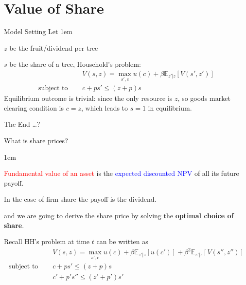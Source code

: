 \documentclass[handout, 11pt,aspectratio=43,usenames,dvipsnames]{beamer}
\newcommand{\red}[1]{\textcolor{red}{#1}}
\newcommand{\blue}[1]{\textcolor{blue}{#1}}
\let\olditemize=\itemize
\let\endolditemize=\enditemize
\renewenvironment{itemize}{\olditemize \itemsep1em}{\endolditemize}
\theoremstyle{definition}
\begin{document}
\section{Value of Share}
\label{sec:Value_of_Share}


\begin{frame}{Model Setting}
\label{slide:Model_Setting}
    Let
    \begin{itemize}
        \item $ z $ be the fruit/dividend per tree
        \item $ s $ be the share of a tree,
    \end{itemize}
    Household's problem:
    \begin{align}
            & V(s, z) = \max_{s', c} u(c) + \beta \mathbb{E}_{z'|z} [V(s', z')]
        \\
        \text{subject to } \quad
            & c + p s' \le (z+p)s
    \end{align}
    Equilibrium outcome is trivial: since the only resource is $ z $, so goods market clearing condition is $ c = z $, which leads to $ s = 1 $ in equilibrium.

    \pause

    \begin{center}
        \faSmileBeam[regular] The End \faSmileBeam[regular]\ldots?
    \end{center}
\end{frame}

\begin{frame}{What is share prices?}
\label{slide:What_is_share_prices_}

\begin{itemize}
    \item \red{Fundamental value of an asset} is the \blue{expected discounted NPV} of all its future payoff.
    \item In the case of firm share the payoff is the dividend.
    \item and we are going to derive the share price by solving the \textbf{optimal choice of share}.
\end{itemize}

Recall HH's problem at time $ t $ can be written as
%
\begin{align}
        & V(s, z) = \max_{s', c} u(c) + \beta \mathbb{E}_{z'|z}[ u(c') ] + \beta^{2} \mathbb{E}_{z'|z} [V(s'', z'')]
    \\
    \text{subject to } \quad
        & c + ps' \le (z+p)s
    \\
        & c' + p' s'' \le (z'+p')s'
\end{align}
%
\end{frame}
\end{document}
